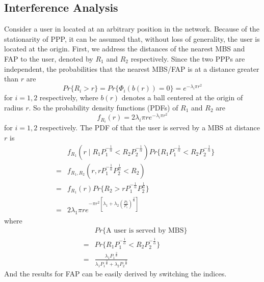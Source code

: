 \documentclass[a4paper,twocolumn]{IEEEtran}
\begin{document}
\subsection{Interference Analysis}
Consider a user in located at an arbitrary position in the network. Because of the stationarity of PPP, it can be assumed that, without loss of generality, the user is located at the origin.
First, we address the distances of the nearest MBS and FAP to the user, denoted by $R_1$ and $R_2$ respectively. Since the two PPPs are independent, the probabilities that the nearest MBS/FAP is at a distance greater than $r$ are
\begin{displaymath}
Pr\{ R_i > r \} = Pr\{ \Phi_i(b(r)) =0\} = e^{-\lambda_i \pi r^2}
\end{displaymath}
for $i=1,2$ respectively, where $b(r)$ denotes a ball centered at the origin of radius $r$. So the probability density functions (PDFs) of $R_1$ and $R_2$ are
\begin{equation}
f_{R_i}(r) = 2\lambda_i \pi r e^{-\lambda_i \pi r^2}
\end{equation}
for $i=1,2$ respectively. The PDF of that the user is served by a MBS at distance $r$ is
\begin{eqnarray}\label{Eq:distance_dist}
&&f_{R_1}(r\mid R_1 P_1^{-\frac{1}{\alpha}} < R_2 P_2^{-\frac{1}{\alpha}}) Pr\{R_1 P_1^{-\frac{1}{\alpha}} < R_2 P_2^{-\frac{1}{\alpha}}\}\nonumber\\
&=&f_{R_1,R_2}(r, r P_1^{-\frac{1}{\alpha}} P_2^{\frac{1}{\alpha}} < R_2)\nonumber\\
&=&f_{R_1}(r) Pr\{ R_2 > r P_1^{-\frac{1}{\alpha}} P_2^{\frac{1}{\alpha}} \} \nonumber\\
&=&2\lambda_1 \pi r e^{- \pi r^2 [ \lambda_1 + \lambda_2 (\frac{P_2}{P_1})^\frac{2}{\alpha} ] }
\end{eqnarray}
where
\begin{eqnarray}
&&Pr\{\text{A user is served by MBS}\}\nonumber\\
&=&Pr\{R_1 P_1^{-\frac{1}{\alpha}} < R_2 P_2^{-\frac{1}{\alpha}}\}\nonumber\\
&=&\frac{\lambda_1 {P_1}^\frac{2}{\alpha}}{\lambda_1 {P_1}^\frac{2}{\alpha} + \lambda_2 {P_2}^\frac{2}{\alpha}}
\end{eqnarray} 
And the results for FAP can be easily derived by switching the indices.
\end{document}
